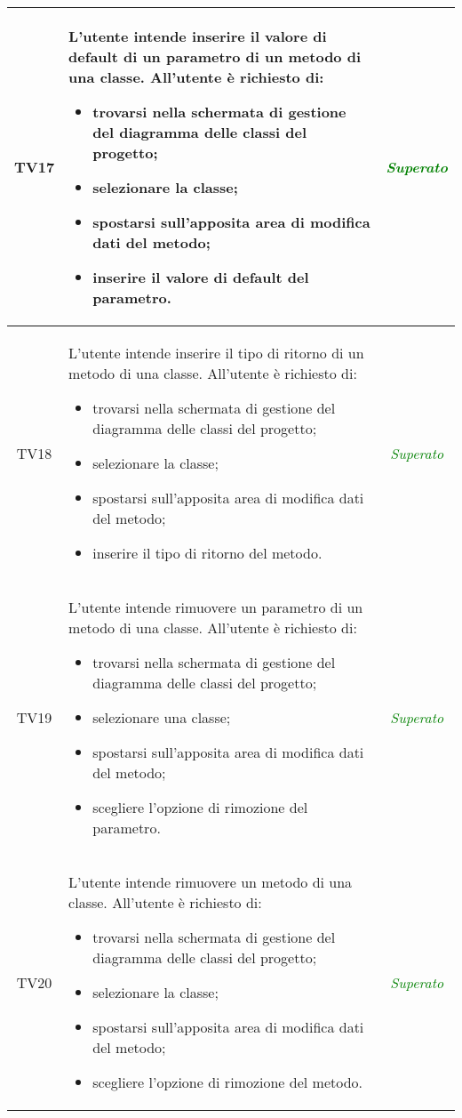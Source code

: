 \begin{longtable}{|c|>{}m{8cm}|c|}
\hypertarget{TV3.1.6.3.3}{TV17} & L'utente intende inserire il valore di default di un parametro di un metodo di una classe.
All'utente è richiesto di:
\begin{itemize}
	\item trovarsi nella schermata di gestione del diagramma delle classi del progetto;
	\item selezionare la classe;
	\item spostarsi sull'apposita area di modifica dati del metodo;
	\item inserire il valore di default del parametro.
\end{itemize} & \textcolor{Green}{\textit{Superato}}\\ \hline

\hypertarget{TV3.1.6.4}{TV18} & L'utente intende inserire il tipo di ritorno di un metodo di una classe.
All'utente è richiesto di:
\begin{itemize}
	\item trovarsi nella schermata di gestione del diagramma delle classi del progetto;
	\item selezionare la classe;
	\item spostarsi sull'apposita area di modifica dati del metodo;
	\item inserire il tipo di ritorno del metodo.
\end{itemize} & \textcolor{Green}{\textit{Superato}}\\ \hline

\hypertarget{TV3.1.6.6}{TV19} & L'utente intende rimuovere un parametro di un metodo di una classe.
All'utente è richiesto di:
\begin{itemize}
	\item trovarsi nella schermata di gestione del diagramma delle classi del progetto;
	\item selezionare una classe;
	\item spostarsi sull'apposita area di modifica dati del metodo;
	\item scegliere l'opzione di rimozione del parametro.
\end{itemize} & \textcolor{Green}{\textit{Superato}}\\ \hline

\hypertarget{TV3.1.7}{TV20} & L'utente intende rimuovere un metodo di una classe.
All'utente è richiesto di:
\begin{itemize}
	\item trovarsi nella schermata di gestione del diagramma delle classi del progetto;
	\item selezionare la classe;
	\item spostarsi sull'apposita area di modifica dati del metodo;
	\item scegliere l'opzione di rimozione del metodo.
\end{itemize} & \textcolor{Green}{\textit{Superato}}\\ \hline


\end{longtable}
